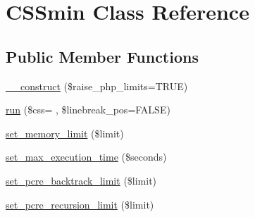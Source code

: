 \hypertarget{class_c_s_smin}{}\section{C\+S\+Smin Class Reference}
\label{class_c_s_smin}
\subsection*{Public Member Functions}
\begin{DoxyCompactItemize}
\item 
\hyperlink{class_c_s_smin_ac3e3c6703dc9bed292d26f4d389eca73}{\+\_\+\+\_\+construct} (\$raise\+\_\+php\+\_\+limits=T\+R\+UE)
\item 
\hyperlink{class_c_s_smin_a0865081f89f43cf05909e544ab448e0d}{run} (\$css= \textquotesingle{}\textquotesingle{}, \$linebreak\+\_\+pos=F\+A\+L\+SE)
\item 
\hyperlink{class_c_s_smin_a8dbf9a7e481d7196ef55638794d483a7}{set\+\_\+memory\+\_\+limit} (\$limit)
\item 
\hyperlink{class_c_s_smin_a4ee822387e2d206ca3b408f7fd5d7a67}{set\+\_\+max\+\_\+execution\+\_\+time} (\$seconds)
\item 
\hyperlink{class_c_s_smin_a5bcff95f0d7c0efe8ecc0882a5855591}{set\+\_\+pcre\+\_\+backtrack\+\_\+limit} (\$limit)
\item 
\hyperlink{class_c_s_smin_a88a21946951b73e4ac6a22488eef2fde}{set\+\_\+pcre\+\_\+recursion\+\_\+limit} (\$limit)
\end{DoxyCompactItemize}
